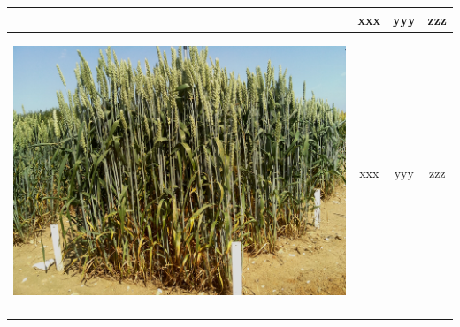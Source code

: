 \begin{table}[h!]
\begin{tabular}{ | c | c | c | c |}
\begin{minipage}{.3\textwidth}
\begin{center}
      \end{center}
    \end{minipage}
    &
      xxx
    & 
      yyy
    & 
      zzz
    \\ \hline
    \begin{minipage}{.3\textwidth}
      \begin{center}
		\includegraphics[width=\linewidth]{Images/010}
      \end{center}
    \end{minipage}
    &
      xxx
    & 
      yyy
    & 
      zzz
    \\ \hline
    \begin{minipage}{.3\textwidth}
      \begin{center}

\end{center}
\end{minipage}
\end{tabular}
\end{table}
